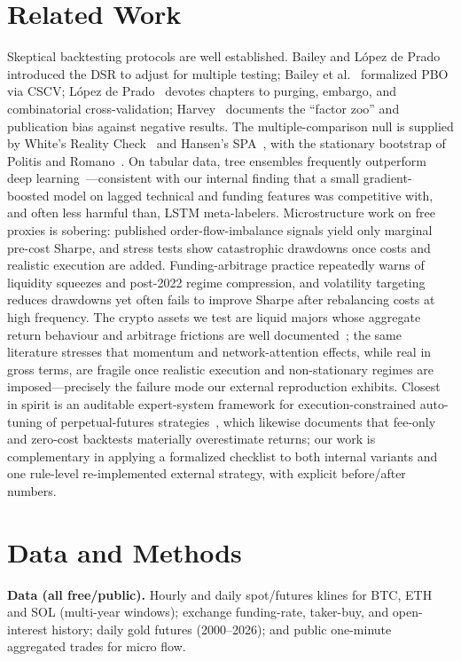 \documentclass[sigconf,anonymous]{acmart}
\begin{document}
\section{Related Work}
Skeptical backtesting protocols are well established. Bailey and L\'opez de Prado~\cite{bailey2014dsr} introduced the DSR to adjust for multiple testing; Bailey et al.~\cite{bailey2015pbo} formalized PBO via CSCV; L\'opez de Prado~\cite{lopezdeprado2018} devotes chapters to purging, embargo, and combinatorial cross-validation; Harvey~\cite{harvey2019} documents the ``factor zoo'' and publication bias against negative results. The multiple-comparison null is supplied by White's Reality Check~\cite{white2000} and Hansen's SPA~\cite{hansen2005}, with the stationary bootstrap of Politis and Romano~\cite{politis1994}. On tabular data, tree ensembles frequently outperform deep learning~\cite{grinsztajn2022,shwartzziv2021}—consistent with our internal finding that a small gradient-boosted model on lagged technical and funding features was competitive with, and often less harmful than, LSTM meta-labelers. Microstructure work on free proxies is sobering: published order-flow-imbalance signals yield only marginal pre-cost Sharpe, and stress tests show catastrophic drawdowns once costs and realistic execution are added. Funding-arbitrage practice repeatedly warns of liquidity squeezes and post-2022 regime compression, and volatility targeting~\cite{moreira2017} reduces drawdowns yet often fails to improve Sharpe after rebalancing costs at high frequency. The crypto assets we test are liquid majors whose aggregate return behaviour and arbitrage frictions are well documented~\cite{liu2021,makarov2020}; the same literature stresses that momentum and network-attention effects, while real in gross terms, are fragile once realistic execution and non-stationary regimes are imposed—precisely the failure mode our external reproduction exhibits. Closest in spirit is an auditable expert-system framework for execution-constrained auto-tuning of perpetual-futures strategies~\cite{deng2025}, which likewise documents that fee-only and zero-cost backtests materially overestimate returns; our work is complementary in applying a formalized checklist to both internal variants and one rule-level re-implemented external strategy, with explicit before/after numbers.

\section{Data and Methods}
\textbf{Data (all free/public).} Hourly and daily spot/futures klines for BTC, ETH and SOL (multi-year windows); exchange funding-rate, taker-buy, and open-interest history; daily gold futures (2000–2026); and public one-minute aggregated trades for micro flow.
\end{document}
